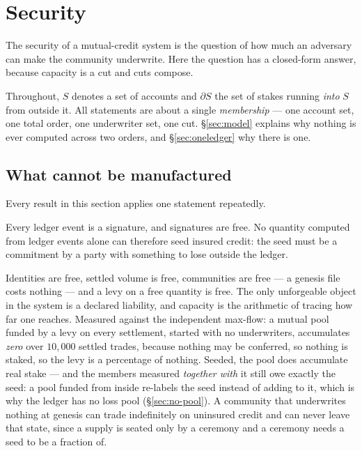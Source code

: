 \section{Security}
\label{sec:security}

The security of a mutual-credit system is the question of how much an adversary can make
the community underwrite. Here the question has a closed-form answer, because capacity is
a cut and cuts compose.

Throughout, $S$ denotes a set of accounts and $\partial S$ the set of stakes running
\emph{into} $S$ from outside it. All statements are about a single \emph{membership} ---
one account set, one total order, one underwriter set, one cut. \S\ref{sec:model} explains
why nothing is ever computed across two orders, and \S\ref{sec:oneledger} why there is one.

\subsection{What cannot be manufactured}

Every result in this section applies one statement repeatedly.

\begin{assumption}
\label{ass:free-signatures}
Every ledger event is a signature, and signatures are free. No quantity computed from
ledger events alone can therefore seed insured credit: the seed must be a commitment by a
party with something to lose outside the ledger.
\end{assumption}

Identities are free, settled volume is free, communities are free --- a genesis file costs
nothing --- and a levy on a free quantity is free. The only unforgeable object in the
system is a declared liability, and capacity is the arithmetic of tracing how far one
reaches. Measured against the independent max-flow: a mutual pool funded by a levy on
every settlement, started with no underwriters, accumulates \emph{zero} over $10{,}000$
settled trades, because nothing may be conferred, so nothing is staked, so the levy is a
percentage of nothing. Seeded, the pool does accumulate real stake --- and the members
measured \emph{together with} it still owe exactly the seed: a pool funded from inside
re-labels the seed instead of adding to it, which is why the ledger has no loss pool
(\S\ref{sec:no-pool}). A community that underwrites nothing at genesis can trade
indefinitely on uninsured credit and can never leave that state, since a supply is seated
only by a ceremony and a ceremony needs a seed to be a fraction of.

